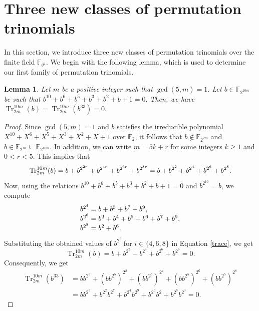 \documentclass[12pt,reqno]{amsart}
\newtheorem{lem}[thm]{Lemma}
\numberwithin{equation}{section}
\theoremstyle{definition}
\newcommand{\F}{\mathbb F}
\begin{document}
\section{Three new classes of permutation trinomials}\label{S3}
In this section, we introduce three new classes of permutation trinomials over the finite field $\F_{q^2}$. We begin with the following lemma, which is used to determine our first family of permutation trinomials. 
\begin{lem}\label{Tr}
Let $m$ be a positive integer such that $\gcd(5,m)=1$. Let $b\in\mathbb{F}_{2^{10m}}$ be such that
$b^{10}+b^6+b^5+b^3+b^2+b+1=0.$ Then, we have
$\operatorname{Tr}_{2m}^{10m}(b)=\operatorname{Tr}_{2m}^{10m}(b^{33})=0.$
\end{lem}
 \begin{proof} Since $\gcd(5,m)=1$ and $b$ satisfies the irreducible polynomial $X^{10}+X^6+X^5+X^3+X^2+X+1$ over $\F_2$, it follows that $b\not\in \F_{2^{2m}}$ and $b\in\mathbb{F}_{2^{10}}\subseteq\mathbb{F}_{2^{10m}}$. In addition, we can write $m=5k+r$ for some integers $k\geq 1$ and $0< r<5$. This implies that
\begin{equation}{\label{trace}}
\operatorname{Tr}_{2m}^{10m}(b)=b+b^{2^{2r}}+b^{2^{4r}}+b^{2^{{6r}}}+b^{2^{{8r}}}=b+b^{2^2}+b^{2^4}+b^{2^{6}}+b^{2^{8}}.
\end{equation}
Now, using the relations $b^{10} + b^6 + b^5 + b^3 + b^2 + b + 1=0 $ and $b^{2^{10}}=b$, we compute\
\begin{equation*}
\begin{tabular}{cc}
$\begin{array}{l}
b^{2^4}=b+b^5+b^7+b^9,\\
b^{2^6}=b^2+b^4+b^5+b^6+b^7+b^9,\\
b^{2^8}=b^2+b^6.		
\end{array}$
\end{tabular}
\end{equation*}
Substituting the obtained values of $b^{2^i}$ for $i \in \{4,6,8\}$ in Equation \eqref{trace}, we get
$$\operatorname{Tr}_{2m}^{10m}(b)=b+b^{2^2}+b^{2^4}+b^{2^{6}}+b^{2^{8}}=0.$$
Consequently, we get
\begin{align*}
\operatorname{Tr}_{2m}^{10m}(b^{33})&={bb^{2^{5}}+{(bb^{2^5})}^{2^2}+{(bb^{2^5})}^{2^4}+{(bb^{2^5})}^{2^6}+{(bb^{2^5})}^{2^8}}\\&=bb^{2^5}+b^{2^2}b^{2^7}+b^{2^4}b^{2^9}+b^{2^6}b^2+b^{2^8}b^{2^3}=0.
\end{align*}
\end{proof}
\end{document}
